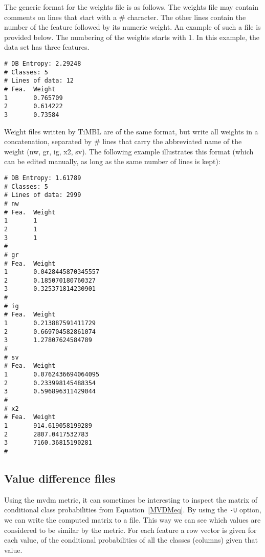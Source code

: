 \documentclass{book}
\begin{document}
The generic format for the weights file is as follows.  The weights
file may contain comments on lines that start with a \# character. The
other lines contain the number of the feature followed by its numeric
weight. An example of such a file is provided below. The numbering of
the weights starts with 1. In this example, the data set has three features.

\begin{footnotesize}
\begin{verbatim}
# DB Entropy: 2.29248
# Classes: 5
# Lines of data: 12
# Fea.  Weight
1       0.765709
2       0.614222
3       0.73584
\end{verbatim}
\end{footnotesize}

Weight files written by TiMBL are of the same format, but write all
weights in a concatenation, separated by \# lines that carry the
abbreviated name of the weight (nw, gr, ig, x2, sv). The following
example illustrates this format (which can be edited manually, as long
as the same number of lines is kept):

\begin{footnotesize}
\begin{verbatim}
# DB Entropy: 1.61789
# Classes: 5
# Lines of data: 2999
# nw
# Fea.  Weight
1       1
2       1
3       1
#
# gr
# Fea.  Weight
1       0.0428445870345557
2       0.185070180760327
3       0.325371814230901
#
# ig
# Fea.  Weight
1       0.213887591411729
2       0.669704582861074
3       1.27807624584789
#
# sv
# Fea.  Weight
1       0.0762436694064095
2       0.233998145488354
3       0.596896311429044
#
# x2
# Fea.  Weight
1       914.619058199289
2       2807.0417532783
3       7160.36815190281
#

\end{verbatim}
\end{footnotesize}


\subsection{Value difference files}
\label{mvdmformat}

Using the {\sc mvdm} metric, it can sometimes be interesting to
inspect the matrix of conditional class probabilities from
Equation~\ref{MVDMeq}. By using the {\tt -U} option, we can write the
computed matrix to a file. This way we can see which values are
considered to be similar by the metric. For each feature a row vector
is given for each value, of the conditional probabilities of all the
classes (columns) given that value.
\end{document}
